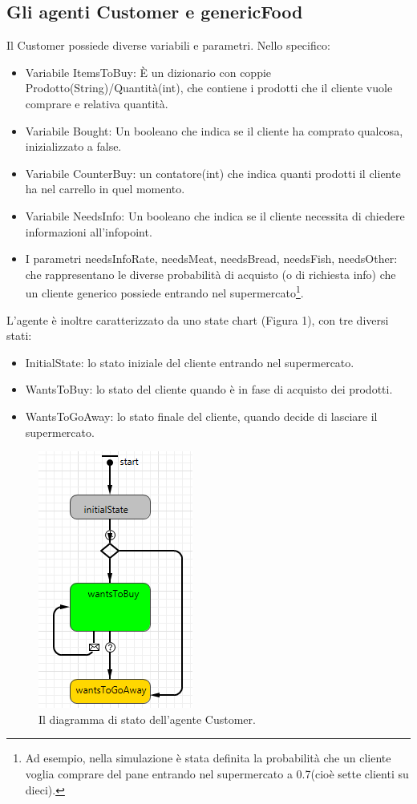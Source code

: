 \documentclass{article}
\begin{document}
\subsection{Gli agenti Customer e genericFood}
Il \textsf{Customer} possiede diverse variabili e parametri. Nello specifico:
\begin{itemize}
\item Variabile \textsf{ItemsToBuy}: È un dizionario con coppie Prodotto(String)/Quantità(int), che contiene i prodotti che il cliente vuole comprare e relativa quantità.
\item Variabile \textsf{Bought}: Un booleano che indica se il cliente ha comprato qualcosa, inizializzato a false.
\item Variabile \textsf{CounterBuy}: un contatore(int) che indica quanti prodotti il cliente ha nel carrello in quel momento.
\item Variabile \textsf{NeedsInfo}: Un booleano che indica se il cliente necessita di chiedere informazioni all'infopoint.
\item I parametri \textsf{needsInfoRate}, \textsf{needsMeat}, \textsf{needsBread}, \textsf{needsFish}, \textsf{needsOther}: che rappresentano le diverse probabilità di acquisto (o di richiesta info) che un cliente generico possiede entrando nel supermercato\footnote{Ad esempio, nella simulazione è stata definita la probabilità che un cliente  voglia comprare del pane entrando nel supermercato a 0.7(cioè sette clienti su dieci).}.
\end{itemize}
L'agente è inoltre caratterizzato da uno state chart (Figura 1), con tre diversi stati:
\begin{itemize}
\item \textsf{InitialState}: lo stato iniziale del cliente entrando nel supermercato.
\item \textsf{WantsToBuy}: lo stato del cliente quando è in fase di acquisto dei prodotti.
\item \textsf{WantsToGoAway}: lo stato finale del cliente, quando decide di lasciare il supermercato.
\end{itemize}
\newpage
\begin{center}
\begin{figure}[h]
\center
\label{statechart}
\includegraphics[scale=0.47]{./statechart.png}
\caption{\footnotesize{Il diagramma di stato dell'agente Customer.}}
\end{figure}
\end{center}
\end{document}
